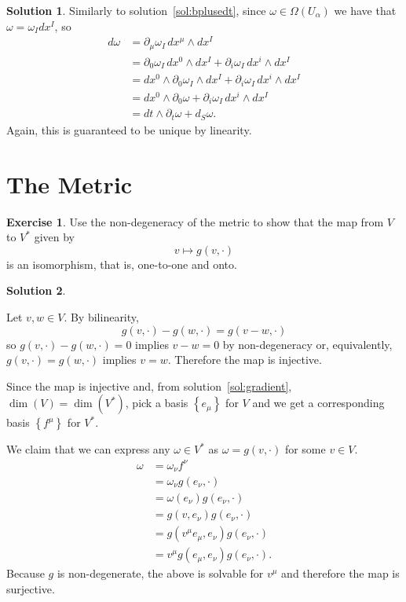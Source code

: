 \documentclass[11pt, a4paper]{report}
\theoremstyle{definition}
\newtheorem{ex}{Exercise}[part]
\newtheorem{sol}{Solution}[part]
\begin{document}
\begin{sol}

Similarly to solution~\ref{sol:bplusedt}, since $\omega \in \Omega(U_\alpha)$ we have that $\omega = \omega_I dx^I$, so
\begin{align*}
    d\omega &= \partial_\mu \omega_I \, dx^\mu \wedge dx^I \\
        &= \partial_0 \omega_I \, dx^0 \wedge dx^I + \partial_i \omega_I \, dx^i \wedge dx^I \\
        &= dx^0 \wedge \partial_0 \omega_I \wedge dx^I + \partial_i \omega_I \, dx^i \wedge dx^I \\
        &= dx^0 \wedge \partial_0 \omega + \partial_i \omega_I \, dx^i \wedge dx^I \\
        &= dt \wedge \partial_t \omega + d_S \omega.
\end{align*}
Again, this is guaranteed to be unique by linearity.

\end{sol}

\section{The Metric}

\begin{ex}

Use the non-degeneracy of the metric to show that the map from $V$ to $V^*$ given by
\[
    v \mapsto g(v, \cdot)
\]
is an isomorphism, that is, one-to-one and onto.

\end{ex}

\begin{sol}\label{sol:metricisomorphism}

Let $v, w \in V$. By bilinearity,
\[
    g(v,\cdot) - g(w,\cdot) = g(v - w, \cdot)
\]
so $g(v,\cdot) - g(w,\cdot) = 0$ implies $v - w = 0$ by non-degeneracy or, equivalently, $g(v,\cdot) = g(w,\cdot)$ implies $v = w$. Therefore the map is injective.

Since the map is injective and, from solution~\ref{sol:gradient}, $\dim(V) = \dim(V^*)$, pick a basis $\left\{e_\mu\right\}$ for $V$ and we get a corresponding basis $\left\{f^\mu\right\}$ for $V^*$.

We claim that we can express any $\omega \in V^*$ as $\omega = g(v,\cdot)$ for some $v \in V$.
\begin{align*}
    \omega &= \omega_\nu f^\nu \\
           &= \omega_\nu g(e_\nu, \cdot) \\
           &= \omega(e_\nu) g(e_\nu, \cdot) \\
           &= g(v, e_\nu) g(e_\nu, \cdot) \\
           &= g(v^\mu e_\mu, e_\nu) g(e_\nu, \cdot) \\
           &= v^\mu g(e_\mu, e_\nu) g(e_\nu, \cdot).
\end{align*}
Because $g$ is non-degenerate, the above is solvable for $v^\mu$ and therefore the map is surjective.

\end{sol}
\end{document}
